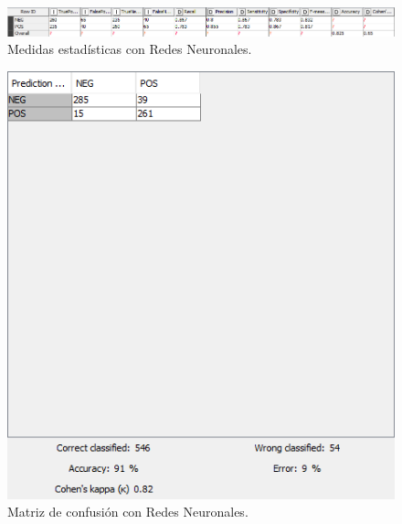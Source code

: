 \begin{figure}[H]
    \center\includegraphics[width=.95\linewidth]{img/classification/scoresNN.png}
    \caption{Medidas estadísticas con Redes Neuronales.}
\end{figure}


\begin{figure}[H]
    \center\includegraphics[width=.95\linewidth]{img/classification/cmRF.png}
    \caption{Matriz de confusión con Redes Neuronales.}
\end{figure}

